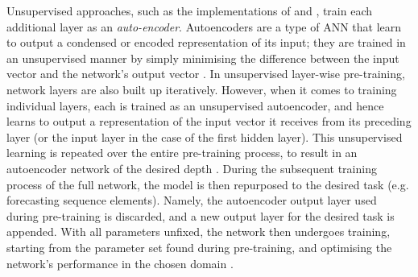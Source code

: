 \documentclass[a4paper, 11pt]{report}
\begin{document}
    Unsupervised approaches, such as the implementations of \citet{xu-2018} and \citet{sagheer-2019}, train each additional layer as an \emph{auto-encoder}. Autoencoders are a type of ANN that learn to output a condensed or encoded representation of its input; they are trained in an unsupervised manner by simply minimising the difference between the input vector and the network's output vector \citep{pinaya-2019}. In unsupervised layer-wise pre-training, network layers are also built up iteratively. However, when it comes to training individual layers, each is trained as an unsupervised autoencoder, and hence learns to output a representation of the input vector it receives from its preceding layer (or the input layer in the case of the first hidden layer). This unsupervised learning is repeated over the entire pre-training process, to result in an autoencoder network of the desired depth \citep{sagheer-2019}. During the subsequent training process of the full network, the model is then repurposed to the desired task (e.g. forecasting sequence elements). Namely, the autoencoder output layer used during pre-training is discarded, and a new output layer for the desired task is appended. With all parameters unfixed, the network then undergoes training, starting from the parameter set found during pre-training, and optimising the network's performance in the chosen domain \citep{sagheer-2019}.
\end{document}
